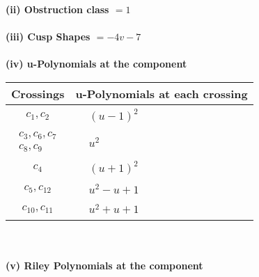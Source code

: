 \documentclass[1p]{elsarticle_modified}
\theoremstyle{definition}
\begin{document}
\flushleft \textbf{(ii) Obstruction class $= 1$}\\~\\
\flushleft \textbf{(iii) Cusp Shapes $= -4 v-7$}\\~\\
\newpage\renewcommand{\arraystretch}{1}
\flushleft \textbf{(iv) u-Polynomials at the component}\newline \\
\begin{tabular}{m{50pt}|m{274pt}}
Crossings & \hspace{64pt}u-Polynomials at each crossing \\
\hline $$\begin{aligned}c_{1},c_{2}\end{aligned}$$&$\begin{aligned}
&(u-1)^2
\end{aligned}$\\
\hline $$\begin{aligned}c_{3},c_{6},c_{7}\\c_{8},c_{9}\end{aligned}$$&$\begin{aligned}
&u^2
\end{aligned}$\\
\hline $$\begin{aligned}c_{4}\end{aligned}$$&$\begin{aligned}
&(u+1)^2
\end{aligned}$\\
\hline $$\begin{aligned}c_{5},c_{12}\end{aligned}$$&$\begin{aligned}
&u^2- u+1
\end{aligned}$\\
\hline $$\begin{aligned}c_{10},c_{11}\end{aligned}$$&$\begin{aligned}
&u^2+u+1
\end{aligned}$\\
\hline
\end{tabular}\\~\\
\newpage\renewcommand{\arraystretch}{1}
\flushleft \textbf{(v) Riley Polynomials at the component}\newline \\
\end{document}

